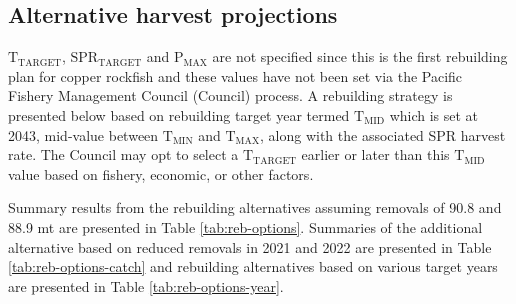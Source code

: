 \documentclass[11pt,
  english,
  a4paper,
]{article}
\begin{document}

\hypertarget{alternative-harvest-projections}{%
\subsection{Alternative harvest projections}\label{alternative-harvest-projections}}

\leavevmode\tagmcend\tagstructend


{\(\text{T}_\text{TARGET}\)\leavevmode\tagmcend\tagstructend}, {\(\text{SPR}_\text{TARGET}\)\leavevmode\tagmcend\tagstructend} and {\(\text{P}_\text{MAX}\)\leavevmode\tagmcend\tagstructend} are not specified since this is the first rebuilding plan for copper rockfish and these values have not been set via the Pacific Fishery Management Council (Council) process. A rebuilding strategy is presented below based on rebuilding target year termed {\(\text{T}_\text{MID}\)\leavevmode\tagmcend\tagstructend} which is set at 2043, mid-value between {\(\text{T}_\text{MIN}\)\leavevmode\tagmcend\tagstructend} and {\(\text{T}_\text{MAX}\)\leavevmode\tagmcend\tagstructend}, along with the associated SPR harvest rate. The Council may opt to select a {\(\text{T}_\text{TARGET}\)\leavevmode\tagmcend\tagstructend} earlier or later than this {\(\text{T}_\text{MID}\)\leavevmode\tagmcend\tagstructend} value based on fishery, economic, or other factors.

\leavevmode\tagmcend\tagstructend\par


Summary results from the rebuilding alternatives assuming removals of 90.8 and 88.9 mt are presented in Table \ref{tab:reb-options}. Summaries of the additional alternative based on reduced removals in 2021 and 2022 are presented in Table \ref{tab:reb-options-catch} and rebuilding alternatives based on various target years are presented in Table \ref{tab:reb-options-year}.

\leavevmode\tagmcend\tagstructend\par
\end{document}
